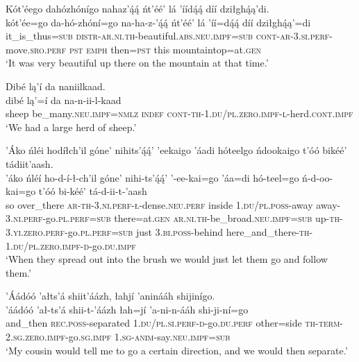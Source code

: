 \ea\label{ex:text6-3-5}
Kót’éego dahózhónígo nahaz’ą́ą́ ńt’éé’ lá ’íídą́ą́ díí dziłghą́ą’di.\\
\gll kót’ée=go	da-hó-zhóní=go	na-ha-z-’ą́ą́	ńt’éé’	lá	’íí=dą́ą́	díí	dziłghą́ą’=di\\
     it\_is\_thus=\textsc{sub}	\textsc{distr}-\textsc{ar}.\textsc{ni}.\textsc{th}-beautiful.\textsc{abs}.\textsc{neu}.\textsc{impf}=\textsc{sub}	\textsc{cont}-\textsc{ar}-3.\textsc{si}.\textsc{perf}-move.\textsc{sro}.\textsc{perf}	\textsc{pst}	\textsc{emph}	then=\textsc{pst}	this	mountaintop=at.\textsc{gen}\\
\glt `It was very beautiful up there on the mountain at that time.'
\z

\ea\label{ex:text6-3-6}
Dibé lą’í da naniilkaad.\\
\gll dibé	lą’=í	da	na-n-ii-l-kaad\\
     sheep	be\_many.\textsc{neu}.\textsc{impf}=\textsc{nmlz}	\textsc{indef}	\textsc{cont}-\textsc{th}-1.\textsc{du}/\textsc{pl}.\textsc{zero}.\textsc{impf}-\textsc{l}-herd.\textsc{cont}.\textsc{impf}\\
\glt `We had a large herd of sheep.'
\z

\ea\label{ex:text6-3-7}
’Áko ńléi hodíłch’il góne’ nihits’ą́ą́’ ’eekaigo ’áadi hóteelgo ńdookaigo t’óó bikéé’ tádiit’aash.\\
\gll ’áko	ńléí	ho-d-í-ł-ch’il	góne’	nihi-ts’ą́ą́’	’-ee-kai=go	’áa=di	hó-teel=go	ń-d-oo-kai=go	t’óó	bi-kéé’	tá-d-ii-t-’aash\\
     so	over\_there	\textsc{ar}-\textsc{th}-3.\textsc{ni}.\textsc{perf}-\textsc{ł}-dense.\textsc{neu}.\textsc{perf}	inside	1.\textsc{du}/\textsc{pl}.\textsc{poss}-away	away-3.\textsc{ni}.\textsc{perf}-go.\textsc{pl}.\textsc{perf}=\textsc{sub}	there=at.\textsc{gen}	\textsc{ar}.\textsc{ni}.\textsc{th}-be\_broad.\textsc{neu}.\textsc{impf}=\textsc{sub}	up-\textsc{th}-3.\textsc{yi}.\textsc{zero}.\textsc{perf}-go.\textsc{pl}.\textsc{perf}=\textsc{sub}	just	3.\textsc{bi}.\textsc{poss}-behind	here\_and\_there-\textsc{th}-1.\textsc{du}/\textsc{pl}.\textsc{zero}.\textsc{impf}-\textsc{d}-go.\textsc{du}.\textsc{impf}\\
\glt `When they spread out into the brush we would just let them go and follow them.'
\z

\ea\label{ex:text6-3-8}
’Áádóó ’ałts’á shiit’áázh, łahjí ’aninááh shijinígo.\\
\gll ’áádóó	’ał-ts’á	shii-t-’áázh	łah=jí	’a-ni-n-ááh	shi-ji-ní=go\\
     and\_then	\textsc{rec}.\textsc{poss}-separated	1.\textsc{du}/\textsc{pl}.\textsc{si}.\textsc{perf}-\textsc{d}-go.\textsc{du}.\textsc{perf}	other=side	\textsc{th}-\textsc{term}-2.\textsc{sg}.\textsc{zero}.\textsc{impf}-go.\textsc{sg}.\textsc{impf}	1.\textsc{sg}-\textsc{anim}-say.\textsc{neu}.\textsc{impf}=\textsc{sub}\\
\glt `My cousin would tell me to go a certain direction, and we would then separate.'
\z

